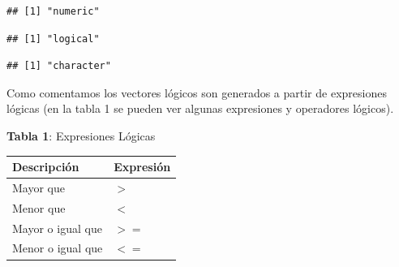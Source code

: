 \documentclass[]{article}
\begin{document}
\begin{verbatim}
## [1] "numeric"
\end{verbatim}

\begin{verbatim}
## [1] "logical"
\end{verbatim}

\begin{verbatim}
## [1] "character"
\end{verbatim}

Como comentamos los vectores lógicos son generados a partir de
expresiones lógicas (en la tabla 1 se pueden ver algunas expresiones y
operadores lógicos).

\textbf{Tabla 1}: Expresiones Lógicas

\begin{longtable}[]{@{}ll@{}}
\toprule
\begin{minipage}[b]{0.29\columnwidth}\raggedright\strut
Descripción\strut
\end{minipage} & \begin{minipage}[b]{0.17\columnwidth}\raggedright\strut
Expresión\strut
\end{minipage}\tabularnewline
\midrule
\endhead
\begin{minipage}[t]{0.29\columnwidth}\raggedright\strut
Mayor que\strut
\end{minipage} & \begin{minipage}[t]{0.17\columnwidth}\raggedright\strut
\(>\)\strut
\end{minipage}\tabularnewline
\begin{minipage}[t]{0.29\columnwidth}\raggedright\strut
Menor que\strut
\end{minipage} & \begin{minipage}[t]{0.17\columnwidth}\raggedright\strut
\(<\)\strut
\end{minipage}\tabularnewline
\begin{minipage}[t]{0.29\columnwidth}\raggedright\strut
Mayor o igual que\strut
\end{minipage} & \begin{minipage}[t]{0.17\columnwidth}\raggedright\strut
\(>=\)\strut
\end{minipage}\tabularnewline
\begin{minipage}[t]{0.29\columnwidth}\raggedright\strut
Menor o igual que\strut
\end{minipage} & \begin{minipage}[t]{0.17\columnwidth}\raggedright\strut
\(<=\)\strut
\end{minipage}\tabularnewline

\end{longtable}
\end{document}
